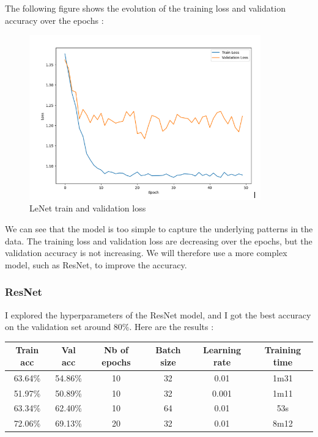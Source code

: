 \documentclass[12pt,a4paper]{article}
\begin{document}
The following figure shows the evolution of the training loss and validation accuracy over the epochs :

\begin{figure}[ht]
    \centering
    \includegraphics[width=10cm]{src/LeNet1.png}
    \caption{LeNet train and validation loss}
\end{figure}

We can see that the model is too simple to capture the underlying patterns in the data.
The training loss and validation loss are decreasing over the epochs, but the validation accuracy is not increasing.
We will therefore use a more complex model, such as ResNet, to improve the accuracy.

\subsubsection{ResNet}

I explored the hyperparameters of the ResNet model, and I got the best accuracy on the validation set around 80\%.
Here are the results :\\

\begin{tabular}{|c|c|c|c|c|c|}
    \hline
    \textbf{Train acc} & \textbf{Val acc} & \textbf{Nb of epochs} & \textbf{Batch size} & \textbf{Learning rate} & \textbf{Training time} \\
    \hline
    63.64\% & 54.86\% & 10 & 32 & 0.01 & 1m31 \\
    \hline
    51.97\% & 50.89\% & 10 & 32 & 0.001 & 1m11 \\
    \hline
    63.34\% & 62.40\% & 10 & 64 & 0.01 & 53s \\
    \hline
    72.06\% & 69.13\% & 20 & 32 & 0.01 & 8m12 \\
    \hline
\end{tabular}\\
\end{document}
